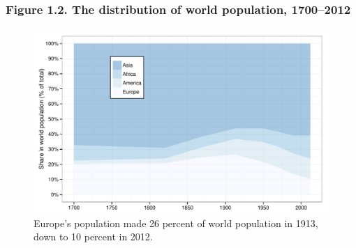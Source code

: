 \documentclass[t]{beamer}\usepackage[]{graphicx}\usepackage[]{color}
\newenvironment{knitrout}{}{} %
\begin{document}
\begin{frame}[label=Figure_1_2b]
\frametitle{Figure 1.2. The distribution of world population, 1700--2012}
\begin{figure}[t]
\begin{minipage}[b]{\textwidth}
\centering
\begin{knitrout}\footnotesize
{}\color{fgcolor}

{\centering \includegraphics[width=1\linewidth]{figures/color/Figure_1_2b} 

}



\end{knitrout}
\caption{Europe's population made 26 percent of world population in 1913, down to 10 percent in 2012.}
\end{minipage}
\end{figure}
\end{frame}
\end{document}
